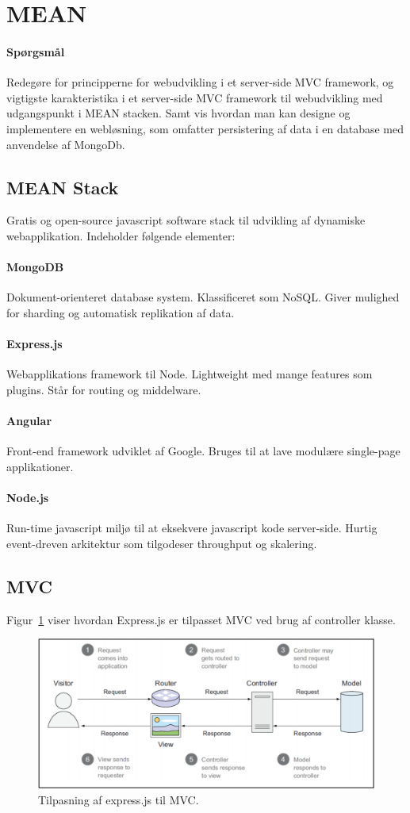 \section{MEAN}

\paragraph{Spørgsmål}
Redegøre for principperne for webudvikling i et server-side MVC framework, og vigtigste karakteristika i et server-side	MVC framework til webudvikling med udgangspunkt i MEAN stacken. Samt vis hvordan man kan designe og implementere en	webløsning, som omfatter persistering af data i en database med anvendelse af MongoDb.

\subsection{MEAN Stack}
Gratis og open-source javascript software stack til udvikling af dynamiske webapplikation. Indeholder følgende elementer:

\paragraph{MongoDB} Dokument-orienteret database system. Klassificeret som NoSQL. Giver mulighed for sharding og automatisk replikation af data.

\paragraph{Express.js} Webapplikations framework til Node. Lightweight med mange features som plugins. Står for routing og middelware.

\paragraph{Angular} Front-end framework udviklet af Google. Bruges til at lave modulære single-page applikationer.

\paragraph{Node.js} Run-time javascript miljø til at eksekvere javascript kode server-side. Hurtig event-dreven arkitektur som tilgodeser throughput og skalering.

\subsection{MVC}
Figur~\ref{fig:mean-mvc} viser hvordan Express.js er tilpasset MVC ved brug af controller klasse.

\begin{figure}[h]
	\centering
	\includegraphics[width=\linewidth]{figs/spm2/mean-mvc}
	\caption{Tilpasning af express.js til MVC.}
	\label{fig:mean-mvc}
\end{figure}
